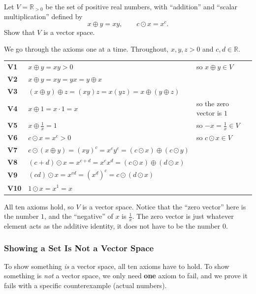\begin{example}
Let $V = \mathbb{R}_{>0}$ be the set of positive real numbers, with ``addition'' and ``scalar multiplication'' defined by
\[
x \oplus y = xy, \qquad c \odot x = x^{c}.
\]
Show that $V$ is a vector space.

\begin{solution}
We go through the axioms one at a time. Throughout, $x, y, z > 0$ and $c, d \in \mathbb{R}$.

\medskip
\begin{center}
\renewcommand{\arraystretch}{1.3}
\begin{tabular}{@{}l l l@{}}
\textbf{V1} & $x \oplus y = xy > 0$ & so $x \oplus y \in V$ \\
\textbf{V2} & $x \oplus y = xy = yx = y \oplus x$ & \\
\textbf{V3} & $(x \oplus y) \oplus z = (xy)z = x(yz) = x \oplus (y \oplus z)$ & \\
\textbf{V4} & $x \oplus 1 = x \cdot 1 = x$ & so the zero vector is $1$ \\
\textbf{V5} & $x \oplus \tfrac{1}{x} = 1$ & so $-x = \tfrac{1}{x} \in V$ \\
\textbf{V6} & $c \odot x = x^{c} > 0$ & so $c \odot x \in V$ \\
\textbf{V7} & $c \odot (x \oplus y) = (xy)^{c} = x^{c}y^{c} = (c \odot x) \oplus (c \odot y)$ & \\
\textbf{V8} & $(c + d) \odot x = x^{c+d} = x^{c}x^{d} = (c \odot x) \oplus (d \odot x)$ & \\
\textbf{V9} & $(cd) \odot x = x^{cd} = (x^{d})^{c} = c \odot (d \odot x)$ & \\
\textbf{V10} & $1 \odot x = x^{1} = x$ & 
\end{tabular}
\end{center}
\medskip

All ten axioms hold, so $V$ is a vector space. Notice that the ``zero vector'' here is the number $1$, and the ``negative'' of $x$ is $\tfrac{1}{x}$. The zero vector is just whatever element acts as the additive identity, it does not have to be the number $0$.
\end{solution}
\end{example}

\subsubsection{Showing a Set Is Not a Vector Space}

To show something \emph{is} a vector space, all ten axioms have to hold. To show something is \emph{not} a vector space, we only need \textbf{one} axiom to fail, and we prove it fails with a specific counterexample (actual numbers).

